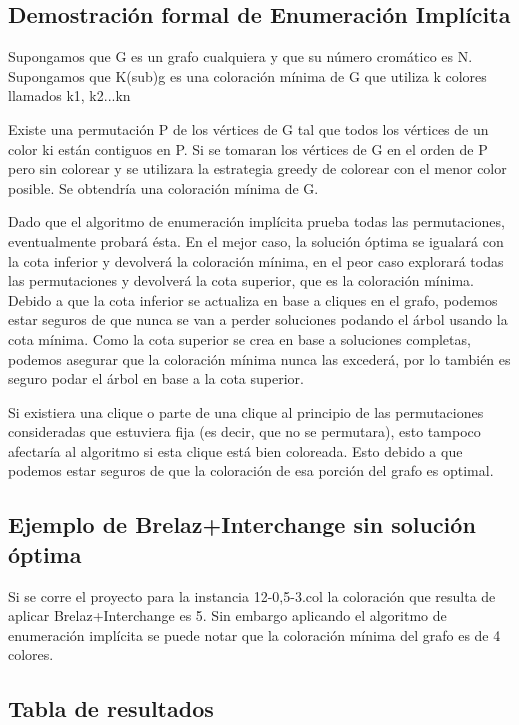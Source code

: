 \documentclass[a4paper,10pt]{article}
\begin{document}
\subsection{Demostración formal de Enumeración Implícita}
Supongamos que G es un grafo cualquiera y que su número cromático es N.
Supongamos que K(sub)g es una coloración mínima de G que utiliza k colores llamados k1, k2...kn

   Existe una permutación P de los vértices de G tal que todos los vértices de un color ki están contiguos en P.
      Si se tomaran los vértices de G en el orden de P pero sin colorear y se utilizara la estrategia greedy de colorear con el menor color posible. Se obtendría una coloración mínima de G.
      
      Dado que el algoritmo de enumeración implícita prueba todas las permutaciones, eventualmente probará ésta. En el mejor caso, la solución óptima se igualará con la cota inferior y devolverá la coloración mínima, en el peor caso explorará todas las permutaciones y devolverá la cota superior, que es la coloración mínima.
      Debido a que la cota inferior se actualiza en base a cliques en el grafo, podemos estar seguros de que nunca se van a perder soluciones podando el árbol usando la cota mínima.
      Como la cota superior se crea en base a soluciones completas, podemos asegurar que la coloración mínima nunca las excederá, por lo también es seguro podar el árbol en base a la cota superior.


Si existiera una clique o parte de una clique al principio de las permutaciones consideradas que estuviera fija (es decir, que no se permutara), esto tampoco afectaría al algoritmo si esta clique está bien coloreada. Esto debido a que podemos estar seguros de que la coloración de esa porción del grafo es optimal.

\subsection{Ejemplo de Brelaz+Interchange sin solución óptima}
Si se corre el proyecto para la instancia 12-0,5-3.col la coloración que resulta de aplicar Brelaz+Interchange 
es 5. Sin embargo aplicando el algoritmo de enumeración implícita se puede notar que la coloración mínima del grafo
es de 4 colores.
\newpage
\subsection{Tabla de resultados}
\newpage
\end{document}

